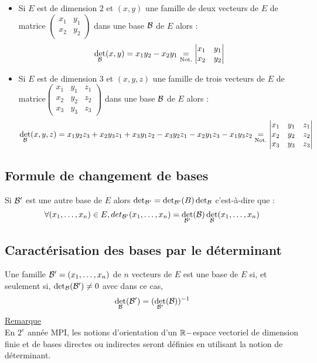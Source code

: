 \begin{defprop}
    \begin{itemize}
        \item Si \(E\) est de dimension \(2\) et \((x, y)\) une famille de deux vecteurs de \(E\) de matrice \(\begin{pmatrix}
              x_{1} & y_{1} \\
              x_{2} & y_{2}
              \end{pmatrix}\) dans une base \(\cal{B}\) de \(E\) alors :
            \[\det_{\cal{B}}(x, y) = x_1y_2 - x_2y_1 \underset{\text{Not.}}{=}\begin{vmatrix}
              x_{1} & y_{1} \\
              x_{2} & y_{2}
              \end{vmatrix}\]
        \item Si \(E\) est de dimension \(3\) et \((x, y, z)\) une famille de trois vecteurs de \(E\) de matrice\(\begin{pmatrix}
              x_{1} & y_{1} & z_{1} \\
              x_{2} & y_{2} & z_{2} \\
              x_{3} & y_{3} & z_{3}
              \end{pmatrix}\) dans une base \(\cal{B}\) de \(E\) alors :
            \[\det_{\cal{B}}(x, y, z) = x_1 y_2 z_3 + x_2 y_3 z_1 + x_3 y_1 z_2 - x_3 y_2 z_1 - x_2 y_1 z_3 - x_1 y_3 z_2 \underset{\text{Not.}}{=} \begin{vmatrix}
              x_{1} & y_{1} & z_{1} \\
              x_{2} & y_{2} & z_{2} \\
              x_{3} & y_{3} & z_{3}
              \end{vmatrix}\]
    \end{itemize}
\end{defprop}
\subsection{Formule de changement de bases}
\begin{defprop}
    Si \(\cal{B}'\) est une autre base de \(E\) alors \(\det_{\cal{B}'} = \det_{\cal{B}'}(B) \det_{\cal{B}}\) c’est-à-dire que :
    \[\forall  (x_1, \dots  , x_n) \in  E, det_{\cal{B}'} (x_1, \dots  , x_n) = \det_{\cal{B}'}(\cal{B}) \det_{\cal{B}} (x_1, \dots  , x_n) \]
\end{defprop}
\subsection{Caractérisation des bases par le déterminant}
\begin{defprop}
    Une famille \(\cal{B}' = (x_1, \dots  , x_n)\) de \(n\) vecteurs de \(E\) est une base de \(E\) si, et seulement si, \(\det_{\cal{B}}(\cal{B}')\neq 0\) avec dans ce cas,
    \[\det_{\cal{B}}(\cal{B}') = (\det_{\cal{B}'}(\cal{B}))^{-1} \]
    \underline{Remarque}\\
    En \(2^e\) année MPI, les notions d’orientation d’un \(\R-\)espace vectoriel de dimension finie et de bases directes ou indirectes seront définies en utilisant la notion de déterminant.
\end{defprop}
